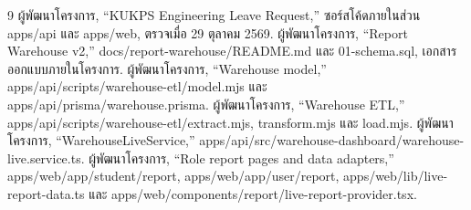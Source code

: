 \begin{thebibliography}{9}
 ผู้พัฒนาโครงการ, ``KUKPS Engineering Leave Request,'' ซอร์สโค้ดภายในส่วน apps/api และ apps/web, ตรวจเมื่อ 29 ตุลาคม 2569.
 ผู้พัฒนาโครงการ, ``Report Warehouse v2,'' docs/report-warehouse/README.md และ 01-schema.sql, เอกสารออกแบบภายในโครงการ.
 ผู้พัฒนาโครงการ, ``Warehouse model,'' apps/api/scripts/warehouse-etl/model.mjs และ apps/api/prisma/warehouse.prisma.
 ผู้พัฒนาโครงการ, ``Warehouse ETL,'' apps/api/scripts/warehouse-etl/extract.mjs, transform.mjs และ load.mjs.
 ผู้พัฒนาโครงการ, ``WarehouseLiveService,'' apps/api/src/warehouse-dashboard/warehouse-live.service.ts.
 ผู้พัฒนาโครงการ, ``Role report pages and data adapters,'' apps/web/app/student/report, apps/web/app/user/report, apps/web/lib/live-report-data.ts และ apps/web/components/report/live-report-provider.tsx.
\end{thebibliography}
